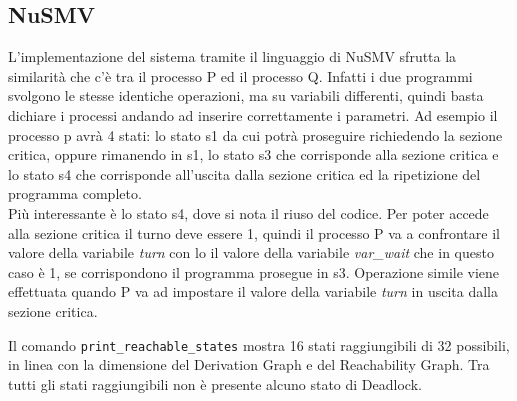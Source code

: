 \documentclass[a4paper]{article}
\begin{document}
\subsection{NuSMV}
L'implementazione del sistema tramite il linguaggio di NuSMV sfrutta la similarità che c'è tra il processo P ed il processo Q.
Infatti i due programmi svolgono le stesse identiche operazioni, ma su variabili differenti, quindi basta dichiare i processi andando ad inserire correttamente i parametri.
Ad esempio il processo p avrà 4 stati: lo stato s1 da cui potrà proseguire richiedendo la sezione critica, oppure rimanendo in s1, lo stato s3 che corrisponde alla sezione critica e lo stato s4 che corrisponde all'uscita dalla sezione critica ed la ripetizione del programma completo.\\
Più interessante è lo stato s4, dove si nota il riuso del codice. 
Per poter accede alla sezione critica il turno deve essere 1, quindi il processo P va a confrontare il valore della variabile \textit{turn} con lo il valore della variabile \textit{var\_wait} che in questo caso è 1, se corrispondono il programma prosegue in s3.
Operazione simile viene effettuata quando P va ad impostare il valore della variabile \textit{turn} in uscita dalla sezione critica.

Il comando \texttt{print\_reachable\_states} mostra 16 stati raggiungibili di 32 possibili, in linea con la dimensione del Derivation Graph e del Reachability Graph.
Tra tutti gli stati raggiungibili non è presente alcuno stato di Deadlock.

\newpage
\end{document}
